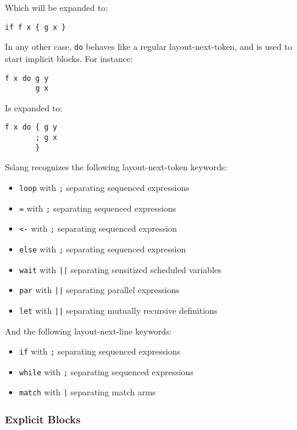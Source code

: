 \documentclass{article}
\begin{document}
Which will be expanded to:

\begin{lstlisting}
if f x { g x }
\end{lstlisting}

In any other case, \texttt{do} behaves like a regular layout-next-token, and is used to start implicit blocks. For instance:

\begin{lstlisting}
f x do g y
       g x
\end{lstlisting}

Is expanded to:

\begin{lstlisting}
f x do { g y
       ; g x
       }
\end{lstlisting}

Sslang recognizes the following layout-next-token keywords:

\begin{itemize}
  \item \texttt{loop} with \texttt{;} separating sequenced expressions
  \item \texttt{=} with \texttt{;} separating sequenced expressions
  \item \texttt{<-} with \texttt{;} separating sequenced expression
  \item \texttt{else} with \texttt{;} separating sequenced expression
  \item \texttt{wait} with \texttt{||} separating sensitized scheduled variables
  \item \texttt{par} with \texttt{||} separating parallel expressions
  \item \texttt{let} with \texttt{||} separating mutually recursive definitions
\end{itemize}

And the following layout-next-line keywords:

\begin{itemize}
  \item \texttt{if} with \texttt{;} separating sequenced expressions
  \item \texttt{while} with \texttt{;} separating sequenced expressions
  \item \texttt{match} with \texttt{|} separating match arms
\end{itemize}

\subsubsection{Explicit Blocks}
\end{document}
